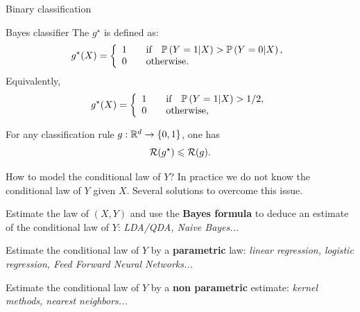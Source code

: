 \documentclass[xcolor={usenames,dvipsnames},handout]{beamer}
\begin{document}

\begin{frame}{Binary classification}

\begin{block}{Bayes classifier} 
The  $g^\star$ is defined as:
$$
g^{\star}(X) =
\left\{
	\begin{array}{cc}
		1 &\quad \text{if} \quad \P \left( Y=1 | X \right) > \P \left( Y=0 | X \right), \\
		0 &\quad \text{otherwise}. \hfill
	\end{array}
\right.
$$
Equivalently,
$$
g^{\star}(X) =
\left\{
	\begin{array}{cc}
		1 &\quad \text{if} \quad \P \left( Y=1 | X \right)> 1/2, \\
		0 &\quad \text{otherwise}, \hfill
	\end{array}
\right.
$$
\end{block}
\begin{lemma}
For any classification rule $g :  \mathbb{R}^d \to \{0,1\}$, one has
$$
{\mathcal{R}}(g^\star) \leqslant {\mathcal{R}}(g).
$$
\end{lemma}
\end{frame}

	
\begin{frame}{How to model the conditional law of $Y$?}
 In practice \alert{we do not know  the conditional law of $Y$ given $X$}. Several solutions to overcome this issue.


\vspace{.4cm}


    
     Estimate the law of $(X,Y)$
      and use the \textbf{Bayes formula} to deduce an estimate of
      the conditional law of $Y$: \emph{LDA/QDA, Naive Bayes...}

\vspace{.3cm}

    
     Estimate the conditional law of
      $Y$ by a \textbf{parametric} law: \emph{linear regression, logistic regression, Feed Forward Neural Networks...}

\vspace{.3cm}

    
     Estimate the conditional  law of
      $Y$ by a \textbf{non parametric} estimate: \emph{kernel
        methods, nearest neighbors...}

 
\end{frame}
\end{document}
